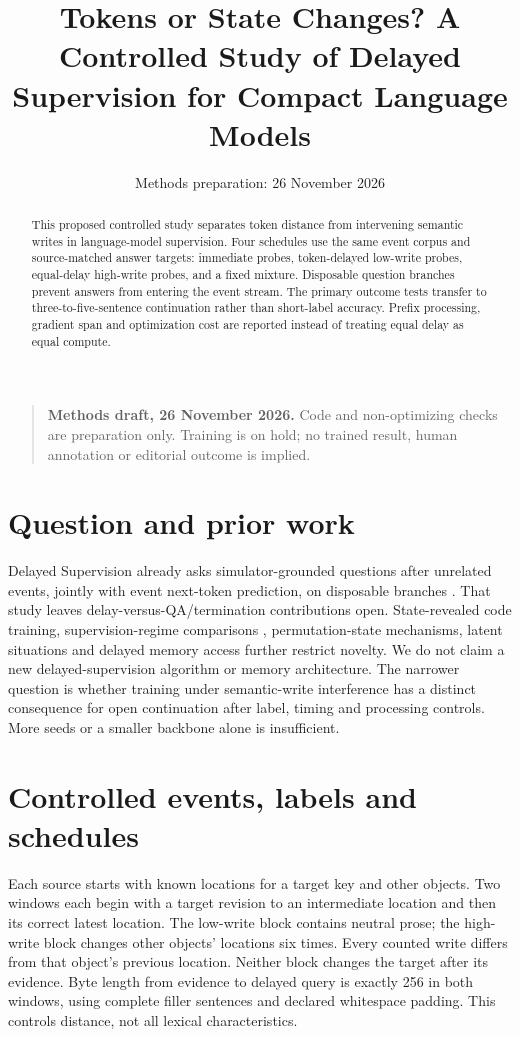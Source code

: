 \documentclass[11pt,a4paper]{article}
\title{Tokens or State Changes? A Controlled Study of Delayed Supervision for Compact Language Models}
\author{}
\date{Methods preparation: 26 November 2026}
\renewcommand{\projectstatus}{\begin{quote}\small\textbf{Methods draft,
26 November 2026.} Code and non-optimizing checks are preparation only.
Training is on hold; no trained result, human annotation or editorial outcome
is implied.\end{quote}}
\begin{document}
\maketitle\projectstatus
\begin{abstract}
This proposed controlled study separates token distance from intervening semantic
writes in language-model supervision. Four schedules use the same event corpus
and source-matched answer targets: immediate probes, token-delayed low-write
probes, equal-delay high-write probes, and a fixed mixture. Disposable question
branches prevent answers from entering the event stream. The primary outcome
tests transfer to three-to-five-sentence continuation rather than short-label
accuracy. Prefix processing, gradient span and optimization cost are reported
instead of treating equal delay as equal compute.
\end{abstract}

\section{Question and prior work}
Delayed Supervision already asks simulator-grounded questions after unrelated
events, jointly with event next-token prediction, on disposable branches
\cite{delayed}. That study leaves delay-versus-QA/termination contributions open.
State-revealed code training\cite{code}, supervision-regime comparisons
\cite{bias}, permutation-state mechanisms\cite{stateicml}, latent situations
\cite{latent} and delayed memory access\cite{schemamem} further restrict novelty.
We do not claim a new delayed-supervision algorithm or memory architecture.
The narrower question is whether training under semantic-write interference
has a distinct consequence for open continuation after label, timing and
processing controls. More seeds or a smaller backbone alone is insufficient.

\section{Controlled events, labels and schedules}
Each source starts with known locations for a target key and other objects.
Two windows each begin with a target revision to an intermediate location and
then its correct latest location. The low-write block contains neutral prose;
the high-write block changes other objects' locations six times. Every counted
write differs from that object's previous location. Neither block changes the
target after its evidence. Byte length from evidence to delayed query is exactly
256 in both windows, using complete filler sentences and declared whitespace
padding. This controls distance, not all lexical characteristics.
\end{document}
